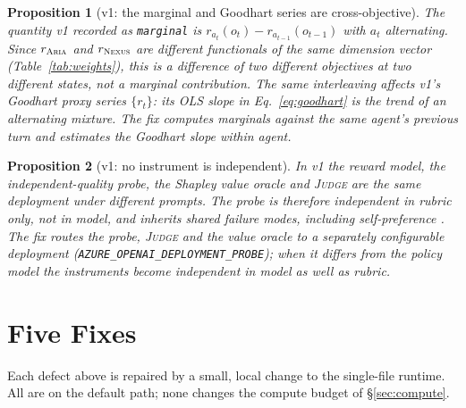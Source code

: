 \documentclass[11pt]{article}
\newcommand{\code}[1]{\texttt{\small #1}}
\newcommand{\ARIA}{\textsc{Aria}}
\newcommand{\NEXUS}{\textsc{Nexus}}
\newcommand{\JUDGE}{\textsc{Judge}}
\theoremstyle{plain}
\newtheorem{proposition}{Proposition}
\theoremstyle{definition}
\begin{document}
\begin{proposition}[v1: the marginal and Goodhart series are cross-objective]
\label{prop:marginal}
The quantity v1 recorded as \code{marginal} is
$r_{a_t}(o_t) - r_{a_{t-1}}(o_{t-1})$ with $a_t$ alternating. Since
$r_{\ARIA{}}$ and $r_{\NEXUS{}}$ are different functionals of the same dimension
vector (Table~\ref{tab:weights}), this is a difference of two \emph{different}
objectives at two different states, not a marginal contribution. The same
interleaving affects v1's Goodhart proxy series $\{r_t\}$: its OLS slope in
Eq.~\ref{eq:goodhart} is the trend of an alternating mixture. The fix computes
marginals against the same agent's previous turn and estimates the Goodhart
slope \emph{within} agent.
\end{proposition}

\begin{proposition}[v1: no instrument is independent]
\label{prop:indep}
In v1 the reward model, the independent-quality probe, the Shapley value oracle
and \JUDGE{} are the same deployment under different prompts. The probe is
therefore independent in \emph{rubric} only, not in \emph{model}, and inherits
shared failure modes, including self-preference \citep{panickssery2024llm}. The
fix routes the probe, \JUDGE{} and the value oracle to a separately configurable
deployment (\code{AZURE\_OPENAI\_DEPLOYMENT\_PROBE}); when it differs from the
policy model the instruments become independent in model as well as rubric.
\end{proposition}

\section{Five Fixes}
\label{sec:fixes}
Each defect above is repaired by a small, local change to the single-file
runtime. All are on the default path; none changes the compute budget of
\S\ref{sec:compute}.
\end{document}
